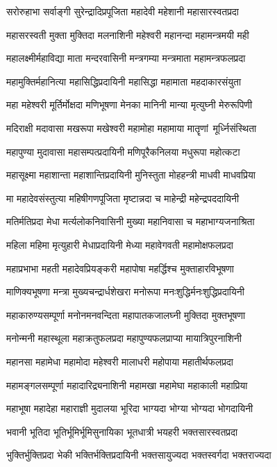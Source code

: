 \twolineshloka
{सरोरुहाभा सर्वाङ्गी सुरेन्द्रादिप्रपूजिता}
{महादेवी महेशानी महासारस्वतप्रदा}%

\twolineshloka
{महासरस्वती मुक्ता मुक्तिदा मलनाशिनी}
{महेश्वरी महानन्दा महामन्त्रमयी मही}%

\twolineshloka
{महालक्ष्मीर्महाविद्या माता मन्दरवासिनी}
{मन्त्रगम्या मन्त्रमाता महामन्त्रफलप्रदा}%

\twolineshloka
{महामुक्तिर्महानित्या महासिद्धिप्रदायिनी}
{महासिद्धा महामाता महदाकारसंयुता}%

\twolineshloka
{महा महेश्वरी मूर्तिर्मोक्षदा मणिभूषणा}
{मेनका मानिनी मान्या मृत्युघ्नी मेरुरूपिणी}%

\twolineshloka
{मदिराक्षी मदावासा मखरूपा मखेश्वरी}
{महामोहा महामाया मातॄणां~मूर्ध्निसंस्थिता}%

\twolineshloka
{महापुण्या मुदावासा महासम्पत्प्रदायिनी}
{मणिपूरैकनिलया मधुरूपा महोत्कटा}%

\twolineshloka
{महासूक्ष्मा महाशान्ता महाशान्तिप्रदायिनी}
{मुनिस्तुता मोहहन्त्री माधवी माधवप्रिया}%

\twolineshloka
{मा महादेवसंस्तुत्या महिषीगणपूजिता}
{मृष्टान्नदा च माहेन्द्री महेन्द्रपददायिनी}%

\twolineshloka
{मतिर्मतिप्रदा मेधा मर्त्यलोकनिवासिनी}
{मुख्या महानिवासा च महाभाग्यजनाश्रिता}%

\twolineshloka
{महिला महिमा मृत्युहारी मेधाप्रदायिनी}
{मेध्या महावेगवती महामोक्षफलप्रदा}%

\twolineshloka
{महाप्रभाभा महती महादेवप्रियङ्करी}
{महापोषा महर्द्धिश्च मुक्ताहारविभूषणा}%

\twolineshloka
{माणिक्यभूषणा मन्त्रा मुख्यचन्द्रार्धशेखरा}
{मनोरूपा मनःशुद्धिर्मनःशुद्धिप्रदायिनी}%

\twolineshloka
{महाकारुण्यसम्पूर्णा मनोनमनवन्दिता}
{महापातकजालघ्नी मुक्तिदा मुक्तभूषणा}%

\twolineshloka
{मनोन्मनी महास्थूला महाक्रतुफलप्रदा}
{महापुण्यफलप्राप्या मायात्रिपुरनाशिनी}%

\twolineshloka
{महानसा महामेधा महामोदा महेश्वरी}
{मालाधरी महोपाया महातीर्थफलप्रदा}%

\twolineshloka
{महामङ्गलसम्पूर्णा महादारिद्र्यनाशिनी}
{महामखा महामेघा महाकाली महाप्रिया}%

\twolineshloka
{महाभूषा महादेहा महाराज्ञी मुदालया}
{भूरिदा भाग्यदा भोग्या भोग्यदा भोगदायिनी}%

\twolineshloka
{भवानी भूतिदा भूतिर्भूमिर्भूमिसुनायिका}
{भूतधात्री भयहरी भक्तसारस्वतप्रदा}%

\twolineshloka
{भुक्तिर्भुक्तिप्रदा भेकी भक्तिर्भक्तिप्रदायिनी}
{भक्तसायुज्यदा भक्तस्वर्गदा भक्तराज्यदा}%

